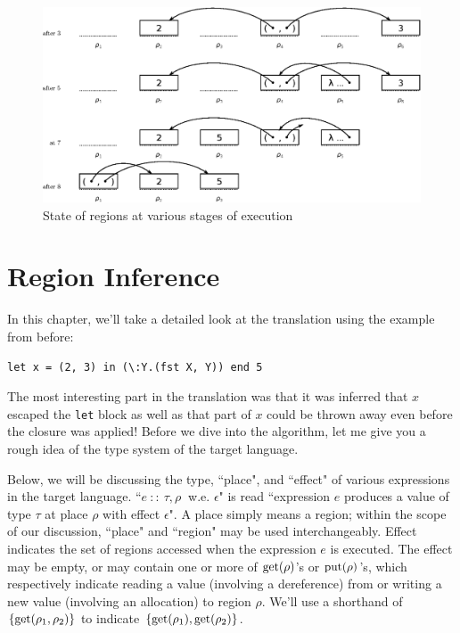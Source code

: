 \documentclass[11pt]{report}
\begin{document}
\begin{figure}[h]
\centering
\includegraphics[width=\textwidth]{regions-flow.eps}
\caption{State of regions at various stages of execution}
\label{fig:regions}
\end{figure}

\chapter{Region Inference}

In this chapter, we'll take a detailed look at the translation using the example from before:

\begin{lstlisting}
let x = (2, 3) in (\:Y.(fst X, Y)) end 5
\end{lstlisting}

The most interesting part in the translation was that it was inferred that $x$ escaped the \texttt{let} block as well as that part of $x$ could be thrown away even before the closure was applied! Before we dive into the algorithm, let me give you a rough idea of the type system of the target language.

Below, we will be discussing the type, ``place", and ``effect" of various expressions in the target language. ``$e~::~\tau, \rho~$ w.e. $\epsilon$" is read ``expression $e$ produces a value of type $\tau$ at place $\rho$ with effect $\epsilon$". A place simply means a region; within the scope of our discussion, ``place" and ``region" may be used interchangeably. Effect indicates the set of regions accessed when the expression $e$ is executed. The effect may be empty, or may contain one or more of $\rm get(\rho)$'s or $\rm put(\rho)$'s, which respectively indicate reading a value (involving a dereference) from or writing a new value (involving an allocation) to region $\rho$. We'll use a shorthand of $\rm \{get(\rho_1, \rho_2)\}$ to indicate $\rm \{get(\rho_1), get(\rho_2)\}$.
\end{document}
